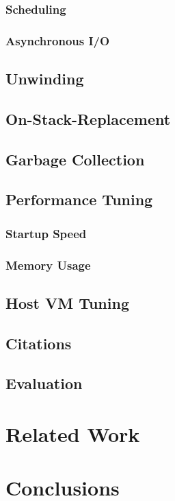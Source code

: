 \documentclass{acm_proc_article-sp}
\begin{document}
\subsubsection{Scheduling}

\subsubsection{Asynchronous I/O}

\subsection{Unwinding}

\subsection{On-Stack-Replacement}

\subsection{Garbage Collection}

\subsection{Performance Tuning}

\subsubsection{Startup Speed}

\subsubsection{Memory Usage}

\subsection{Host VM Tuning}

\subsection{Citations}

\subsection{Evaluation}

\section{Related Work}

\section{Conclusions}


\end{document}
